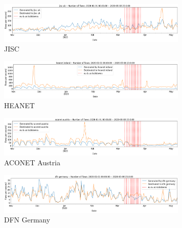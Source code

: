 \documentclass[10pt, journal, letterpaper]{IEEEtran}
\newcommand\linearFigSze{0.48}
\begin{document}
\begin{figure}
    \begin{subfigure}{\linearFigSze\textwidth}
          \centering
          \includegraphics[width=\columnwidth]{img/jisc_fps.png}
          \caption{JISC}
          \label{fig:jisc_fps}
    \end{subfigure}
    \begin{subfigure}{\linearFigSze\textwidth}
          \centering
          \includegraphics[width=\columnwidth]{img/heanet_fps.png}
          \caption{HEANET}
          \label{fig:HEANET_fps}
    \end{subfigure}
    \begin{subfigure}{\linearFigSze\textwidth}
          \centering
          \includegraphics[width=\columnwidth]{img/aconet_fps.png}
          \caption{ACONET Austria}
          \label{fig:aconet_fps}
    \end{subfigure}
    \begin{subfigure}{\linearFigSze\textwidth}
          \centering
          \includegraphics[width=\columnwidth]{img/dfn_fps.png}
          \caption{DFN Germany}
          \label{fig:dfn_fps}
    \end{subfigure}
    \begin{subfigure}{\linearFigSze\textwidth}

\end{subfigure}
\end{figure}
\end{document}
